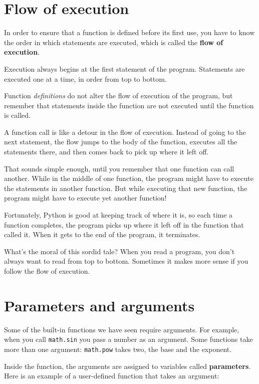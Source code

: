 \documentclass[10pt]{book}
\begin{document}
\section{Flow of execution}

In order to ensure that a function is defined before its first use,
you have to know the order in which statements are executed, which is
called the {\bf flow of execution}.

Execution always begins at the first statement of the program.
Statements are executed one at a time, in order from top to bottom.

Function {\em definitions} do not alter the flow of execution of the
program, but remember that statements inside the function are not
executed until the function is called.

A function call is like a detour in the flow of execution. Instead of
going to the next statement, the flow jumps to the body of
the function, executes all the statements there, and then comes back
to pick up where it left off.

That sounds simple enough, until you remember that one function can
call another.  While in the middle of one function, the program might
have to execute the statements in another function. But while
executing that new function, the program might have to execute yet
another function!

Fortunately, Python is good at keeping track of where it is, so each
time a function completes, the program picks up where it left off in
the function that called it.  When it gets to the end of the program,
it terminates.

What's the moral of this sordid tale?  When you read a program, you
don't always want to read from top to bottom.  Sometimes it makes
more sense if you follow the flow of execution.


\section{Parameters and arguments}
\label{parameters}

Some of the built-in functions we have seen require arguments.  For
example, when you call {\tt math.sin} you pass a number
as an argument.  Some functions take more than one argument:
{\tt math.pow} takes two, the base and the exponent.

Inside the function, the arguments are assigned to
variables called {\bf parameters}.  Here is an example of a
user-defined function that takes an argument:
\end{document}
